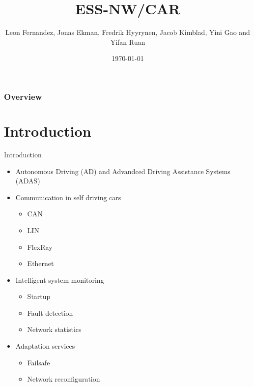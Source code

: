 \documentclass{beamer}
\title[ESS-NW/CAR]{ESS-NW/CAR } %
\author{ Leon Fernandez, Jonas Ekman, Fredrik Hyyrynen, Jacob Kimblad, Yini Gao and  Yifan Ruan} %
\institute[KTH] %
{
MF2063 \\ %
\medskip

}
\date{\today} %
\begin{document}
\begin{frame}
\titlepage %
\end{frame}

\begin{frame}
\frametitle{Overview} %
\tableofcontents %
\end{frame}


\section{Introduction} 
    
\begin{frame}{Introduction}
    \begin{itemize}
        \item Autonomous Driving (AD) and Advandced Driving Assistance Systems (ADAS)
        \item Communication in self driving cars
        \begin{itemize}
            \item CAN
            \item LIN
            \item FlexRay
            \item Ethernet
        \end{itemize}
        \item Intelligent system monitoring
        \begin{itemize}
            \item Startup
            \item Fault detection
            \item Network statistics
        \end{itemize}
        \item Adaptation services
        \begin{itemize}
            \item Failsafe
            \item Network reconfiguration
        \end{itemize}

    \end{itemize}
\end{frame}
\end{document}
